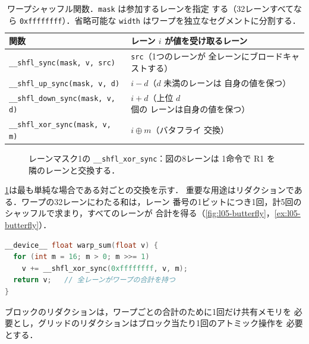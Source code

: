 \documentclass[../main.tex]{subfiles}
\begin{document}
\begin{table}[tb]
  \centering
  \small
  \caption{ワープシャッフル関数．\texttt{mask} は参加するレーンを指定
    する（32レーンすべてなら \texttt{0xffffffff}）．省略可能な
    \texttt{width} はワープを独立なセグメントに分割する．}
  \label{tab:l05-shuffle}
  \begin{tabular}{>{\raggedright\arraybackslash}p{52mm}
                  >{\raggedright\arraybackslash}p{58mm}}
    \toprule
    関数 & レーン $i$ が値を受け取るレーン \\
    \midrule
    \texttt{\_\_shfl\_sync(mask, v, src)} & \texttt{src}（1つのレーンが
      全レーンにブロードキャストする） \\
    \texttt{\_\_shfl\_up\_sync(mask, v, d)} & $i - d$（$d$ 未満のレーンは
      自身の値を保つ） \\
    \texttt{\_\_shfl\_down\_sync(mask, v, d)} & $i + d$（上位 $d$ 個の
      レーンは自身の値を保つ） \\
    \texttt{\_\_shfl\_xor\_sync(mask, v, m)} & $i \oplus m$（バタフライ
      交換） \\
    \bottomrule
  \end{tabular}
\end{table}

\begin{figure}[tb]
  \centering
  
  \caption{レーンマスク1の \texttt{\_\_shfl\_xor\_sync}：図の8レーンは
    1命令で R1 を隣のレーンと交換する．}
  \label{fig:l05-shuffle-xor}
\end{figure}

\cref{fig:l05-shuffle-xor}は最も単純な場合である対ごとの交換を示す．
重要な用途はリダクションである．ワープの32レーンにわたる和は，レーン
番号の1ビットにつき1回，計5回のシャッフルで求まり，すべてのレーンが
合計を得る（\cref{fig:l05-butterfly}，\cref{ex:l05-butterfly}）．
\begin{lstlisting}[language=C++, numbers=none]
__device__ float warp_sum(float v) {
  for (int m = 16; m > 0; m >>= 1)
    v += __shfl_xor_sync(0xffffffff, v, m);
  return v;   // 全レーンがワープの合計を持つ
}
\end{lstlisting}
ブロックのリダクションは，ワープごとの合計のために1回だけ共有メモリを
必要とし，グリッドのリダクションはブロック当たり1回のアトミック操作を
必要とする．
\end{document}
